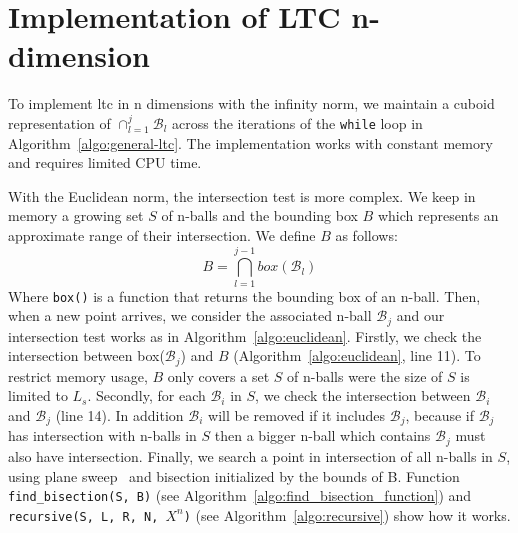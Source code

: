 \section{Implementation of LTC n-dimension}
\label{sec:implementation}
To implement \acrshort{ltc} in n dimensions with the infinity norm, we maintain a cuboid
representation of $\cap_{l=1}^j{\mathcal{B}_l}$ across the iterations of the
\texttt{while} loop in Algorithm~\ref{algo:general-ltc}. The implementation
works with constant memory and requires limited CPU time.

With the Euclidean norm, the intersection test is more complex. We keep in
memory a growing set $S$ of n-balls and the bounding box $B$ which represents an
approximate range of their intersection. We define $B$ as follows:
\begin{equation*}
    B = \bigcap_{l=1}^{j-1} box(\mathcal{B}_l) 
\end{equation*}
Where \texttt{box()} is a function that returns the bounding box of an n-ball.
Then, when a new point arrives, we consider the associated n-ball
$\mathcal{B}_j$ and our intersection test works as in
Algorithm~\ref{algo:euclidean}. Firstly, we check the intersection between
box($\mathcal{B}_j$) and $B$ (Algorithm~\ref{algo:euclidean}, line 11). To
restrict memory usage, $B$ only covers a set $S$ of n-balls were the size of $S$
is limited to $L_s$. Secondly, for each $\mathcal{B}_i$ in $S$, we check the
intersection between $\mathcal{B}_i$ and $\mathcal{B}_j$ (line 14). In addition
$\mathcal{B}_i$ will be removed if it includes $\mathcal{B}_j$, because if
$\mathcal{B}_j$ has intersection with n-balls in $S$ then a bigger n-ball which
contains $\mathcal{B}_j$ must also have intersection.
Finally, we search a point in intersection of all n-balls in $S$, using plane
sweep~\cite{shamos1976geometric, souvaine2008line} and bisection initialized by
the bounds of B. Function \texttt{find\_bisection(S, B)} (see
Algorithm~\ref{algo:find_bisection_function}) and \texttt{recursive(S, L, R, N,
$X^n$)} (see Algorithm~\ref{algo:recursive}) show how it works. 

